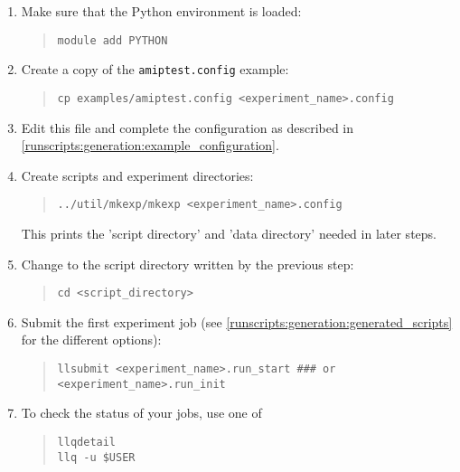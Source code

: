 \begin{enumerate}

\item

Make sure that the Python environment is loaded:
\begin{quote}
\begin{verbatim}
module add PYTHON
\end{verbatim}
\end{quote}

\item

Create a copy of the \texttt{amiptest.config} example:
%
\begin{quote}
\begin{verbatim}
cp examples/amiptest.config <experiment_name>.config
\end{verbatim}
\end{quote}

\item

Edit this file and complete the configuration as described in
\ref{runscripts:generation:example_configuration}.

\item

Create scripts and experiment directories:
\begin{quote}
\begin{verbatim}
../util/mkexp/mkexp <experiment_name>.config
\end{verbatim}
\end{quote}
This prints the 'script directory' and 'data directory' needed in later steps.

\item

Change to the script directory written by the previous step:
\begin{quote}
\begin{verbatim}
cd <script_directory>
\end{verbatim}
\end{quote}

\item

Submit the first experiment job (see
\ref{runscripts:generation:generated_scripts} for the different options):
%
\begin{quote}
\begin{verbatim}
llsubmit <experiment_name>.run_start ### or <experiment_name>.run_init
\end{verbatim}
\end{quote}

\item 

To check the status of your jobs, use one of
%
\begin{quote}
\begin{verbatim}
llqdetail
llq -u $USER
\end{verbatim}
\end{quote}

\end{enumerate}

